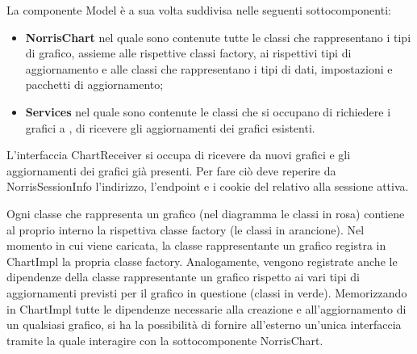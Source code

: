 La componente Model è a sua volta suddivisa nelle seguenti sottocomponenti:
\begin{itemize}
\item \textbf{NorrisChart} nel quale sono contenute tutte le classi che rappresentano i tipi di grafico, assieme alle rispettive classi factory, ai rispettivi tipi di aggiornamento e alle classi che rappresentano i tipi di dati, impostazioni e pacchetti di aggiornamento; 
\item \textbf{Services} nel quale sono contenute le classi che si occupano di richiedere i grafici a , di ricevere gli aggiornamenti dei grafici esistenti.
\end{itemize}

L'interfaccia ChartReceiver si occupa di ricevere da  nuovi grafici e gli aggiornamenti dei grafici già presenti. Per fare ciò deve reperire da NorrisSessionInfo l'indirizzo, l'endpoint e i cookie del  relativo alla sessione attiva.

Ogni classe che rappresenta un grafico (nel diagramma le classi in rosa) contiene al proprio interno la rispettiva classe factory (le classi in arancione). Nel momento in cui viene caricata, la classe rappresentante un grafico registra in ChartImpl la propria classe factory. Analogamente, vengono registrate anche le dipendenze della classe rappresentante un grafico rispetto ai vari tipi di aggiornamenti previsti per il grafico in questione (classi in verde). Memorizzando in ChartImpl tutte le dipendenze necessarie alla creazione e all'aggiornamento di un qualsiasi grafico, si ha la possibilità di fornire all'esterno un'unica interfaccia tramite la quale interagire con la sottocomponente NorrisChart.


